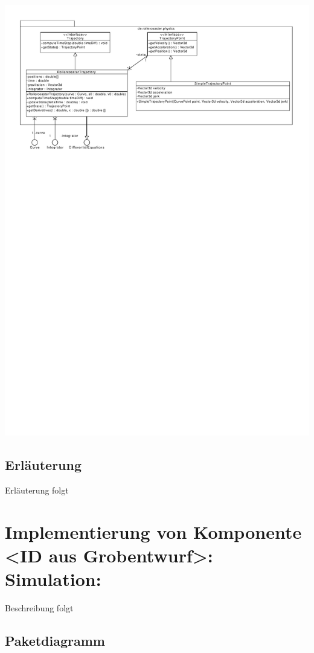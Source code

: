 \includegraphics[width=\linewidth]{bilder/Physics}

\subsection{Erläuterung}

Erläuterung folgt


\section{Implementierung von Komponente
         <ID aus Grobentwurf>: Simulation:}

Beschreibung folgt

\subsection{Paketdiagramm}

